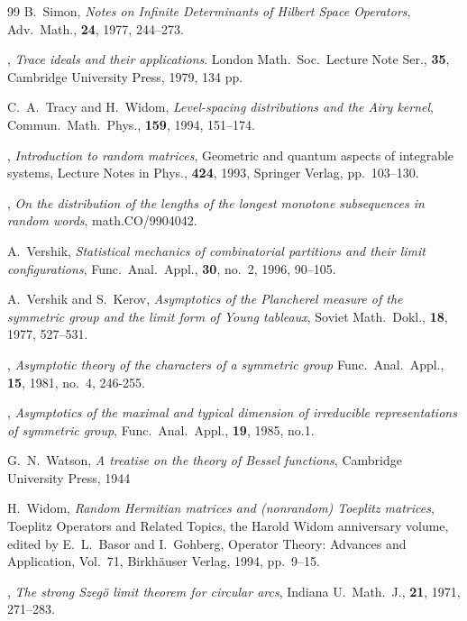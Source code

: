 \documentclass[12pt]{amsart}
\theoremstyle{plain}
\theoremstyle{definition}
\numberwithin{equation}{section}
\begin{document}
\begin{thebibliography}{99}
B.~Simon,
\emph{Notes on Infinite Determinants of Hilbert Space Operators},
Adv.\ Math., \textbf{24}, 1977, 244--273. 

\bysame,
\emph{Trace ideals and their applications}.
London Math.\ Soc.\ Lecture Note Ser., \textbf{35},
Cambridge University Press, 1979, 134 pp.

C.~A.~Tracy and H.~Widom,
\emph{Level-spacing distributions and the Airy kernel},
Commun.\ Math.\ Phys., \textbf{159}, 1994, 151--174.  

\bysame, 
\emph{Introduction to random matrices}, Geometric and quantum aspects of
integrable systems,
Lecture Notes in Phys., \textbf{424}, 1993, 
Springer Verlag, pp.\ 103--130. 

\bysame,
\emph{On the distribution of the lengths of the longest monotone
subsequences in random words}, math.CO/9904042.


A.~Vershik,
\emph{Statistical mechanics of combinatorial partitions
and their limit configurations},
Func.\ Anal.\ Appl., \textbf{30}, no.~2, 1996, 90--105. 


A.~Vershik and S.~Kerov, 
\emph{Asymptotics of the Plancherel measure of the 
symmetric group and the limit form of Young
tableaux},
Soviet Math.\ Dokl., \textbf{18}, 1977, 527--531.

\bysame, 
\emph{Asymptotic theory of the characters of a symmetric group}
Func.\ Anal.\ Appl., \textbf{15}, 1981, no.\ 4,
246-255. 

\bysame, 
\emph{Asymptotics of the maximal and typical
dimension of irreducible representations of symmetric
group},
Func.\ Anal.\ Appl., \textbf{19}, 1985, no.1.


G.~N.~Watson,
\emph{A treatise on the theory of Bessel functions},
Cambridge University Press, 1944

H.~Widom,
\emph{Random Hermitian matrices and (nonrandom)
Toeplitz matrices}, 
Toeplitz Operators and Related Topics, the Harold
Widom anniversary volume, 
edited by E.~L.~Basor and I.~Gohberg,
Operator Theory:  Advances and Application,
Vol.~71, Birkh\"auser Verlag, 1994, pp.\ 9--15. 

\bysame, 
\emph{The strong Szeg\"o limit theorem for circular
arcs}, Indiana U.\ Math.\ J., \textbf{21}, 1971, 271--283. 

\end{thebibliography}
\end{document}

